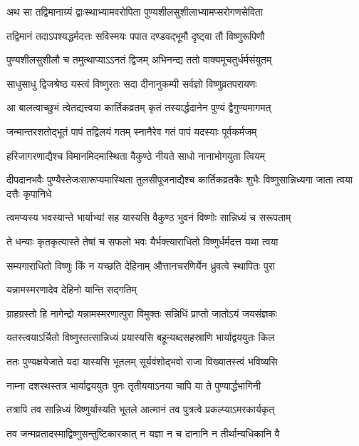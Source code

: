 \twolineshloka
{अथ सा तद्विमानाग्र्यं द्वाःस्थाभ्यामवरोपिता}
{पुण्यशीलसुशीलाभ्यामप्सरोगणसेविता} %

\twolineshloka
{तद्विमानं तदाऽपश्यद्धर्मदत्तः सविस्मयः}
{पपात दण्डवद्भूमौ दृष्ट्वा तौ विष्णुरूपिणौ} %

\twolineshloka
{पुण्यशीलसुशीलौ च तमुत्थाप्याऽऽनतं द्विजम्}
{अभिनन्द्य ततो वाक्यमूचतुर्धर्मसंयुतम्} %


\twolineshloka
{साधुसाधु द्विजश्रेष्ठ यस्त्वं विष्णुरतः सदा}
{दीनानुकम्पी सर्वज्ञो विष्णुव्रतपरायणः} %


\twolineshloka
{आ बालत्वाच्छुभं त्वेतद्यत्त्वया कार्तिकव्रतम्}
{कृतं तस्यार्द्धदानेन पुण्यं द्वैगुण्यमागमत्} %

\twolineshloka
{जन्मान्तरशतोद्भूतं पापं तद्विलयं गतम्}
{स्नानैरेव गतं पापं यदस्याः पूर्वकर्मजम्} %

\twolineshloka
{हरिजागरणाद्यैश्च विमानमिदमास्थिता}
{वैकुण्ठे नीयते साधो नानाभोगयुता त्वियम्} %

\threelineshloka
{दीपदानभवैः पुण्यैस्तेजःसारूप्यमास्थिता}
{तुलसीपूजनाद्यैश्च कार्तिकव्रतकैः शुभैः}
{विष्णुसान्निध्यगा जाता त्वया दत्तैः कृपानिधे} %

\twolineshloka
{त्वमप्यस्य भवस्यान्ते भार्याभ्यां सह यास्यसि}
{वैकुण्ठ भुवनं विष्णोः सान्निध्यं च सरूपताम्} %

\twolineshloka
{ते धन्याः कृतकृत्यास्ते तेषां च सफलो भवः}
{यैर्भक्त्याराधितो विष्णुर्धर्मदत्त यथा त्वया} %

\twolineshloka
{सम्यगाराधितो विष्णुः किं न यच्छति देहिनाम्}
{औत्तानचरणिर्येन ध्रुवत्वे स्थापितः पुरा} %


\onelineshloka
{यन्नामस्मरणादेव देहिनो यान्ति सद्गतिम्} %

\twolineshloka
{ग्राहग्रस्तो हि नागेन्द्रो यन्नामस्मरणात्पुरा}
{विमुक्तः सन्निधिं प्राप्तो जातोऽयं जयसंज्ञकः} %

\twolineshloka
{यतस्त्वयाऽर्चितो विष्णुस्तत्सान्निध्यं प्रयास्यसि}
{बहून्यब्दसहस्राणि भार्याद्वययुतः किल} %

\twolineshloka
{ततः पुण्यक्षयेजाते यदा यास्यसि भूतलम्}
{सूर्यवंशोद्भवो राजा विख्यातस्त्वं भविष्यसि} %

\twolineshloka
{नाम्ना दशरथस्तत्र भार्याद्वययुतः पुनः}
{तृतीययाऽनया चापि या ते पुण्यार्द्धभागिनी} %

\twolineshloka
{तत्रापि तव सान्निध्यं विष्णुर्यास्यति भूतले}
{आत्मानं तव पुत्रत्वे प्रकल्प्याऽमरकार्यकृत्} %

\twolineshloka
{तव जन्मव्रतादस्माद्विष्णुसन्तुष्टिकारकात्}
{न यज्ञा न च दानानि न तीर्थान्यधिकानि वै} %


